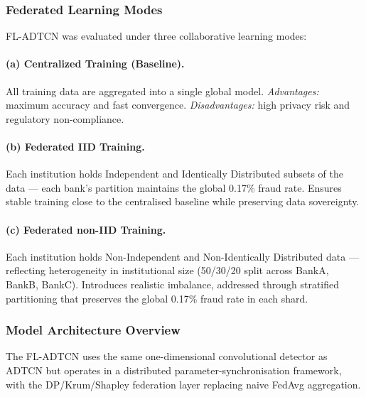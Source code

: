 \subsubsection*{Federated Learning Modes}
FL-ADTCN was evaluated under three collaborative learning modes:

\paragraph{(a) Centralized Training (Baseline).}
All training data are aggregated into a single global model. \textit{Advantages:} maximum accuracy and fast convergence. \textit{Disadvantages:} high privacy risk and regulatory non-compliance.

\paragraph{(b) Federated IID Training.}
Each institution holds Independent and Identically Distributed subsets of the data — each bank's partition maintains the global 0.17\% fraud rate. Ensures stable training close to the centralised baseline while preserving data sovereignty.

\paragraph{(c) Federated non-IID Training.}
Each institution holds Non-Independent and Non-Identically Distributed data — reflecting heterogeneity in institutional size (50/30/20 split across BankA, BankB, BankC). Introduces realistic imbalance, addressed through stratified partitioning that preserves the global 0.17\% fraud rate in each shard.

\subsubsection*{Model Architecture Overview}
The FL-ADTCN uses the same one-dimensional convolutional detector as ADTCN but operates in a distributed parameter-synchronisation framework, with the DP/Krum/Shapley federation layer replacing naive FedAvg aggregation.

